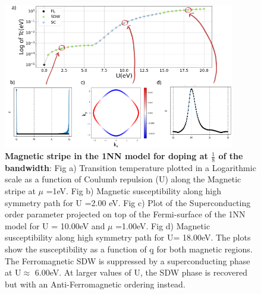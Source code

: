 \documentclass[12pt]{article}
\begin{document}
\begin{figure}[htbp]  %
    \centering
    \includegraphics[width=0.9\textwidth]{1NNstripes.png}  %
    \caption{\textbf{Magnetic stripe in the 1NN model for doping at $\frac{1}{8}$ of the bandwidth}: Fig a) Transition temperature plotted in a Logarithmic scale as a function of Coulumb repulsion (U) along the Magnetic stripe at $\mu$ =1eV. 
       Fig b) Magnetic susceptibility along high symmetry path for U =2.00 eV. 
       Fig c) Plot of the Superconducting order parameter projected on top of the Fermi-surface of the 1NN model for U = 10.00eV and $\mu$ =1.00eV.
       Fig d) Magnetic susceptibility along high symmetry path for U= 18.00eV. The plots show the susceptibility as a function of \b{q} for both magnetic regions. The Ferromagnetic SDW is suppressed by a superconducting phase at U$\approx$ 6.00eV. At larger values of U,  the SDW phase is recovered but with an Anti-Ferromagnetic ordering instead.  }
    \label{fig:1NN_stripes}
\end{figure}
\end{document}
